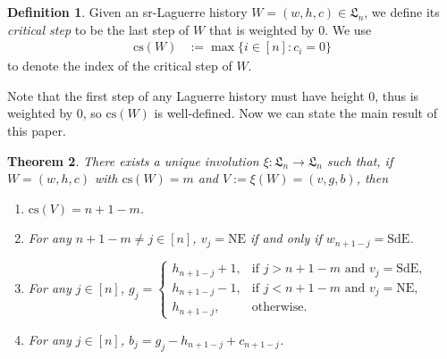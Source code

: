 \documentclass[12pt]{amsart}
\numberwithin{equation}{section}
\theoremstyle{plain}
\newtheorem{theorem}{Theorem}[section]
\theoremstyle{definition}
\newtheorem{Def}[theorem]{Definition}
\def\LH{\mathfrak{L}}
\def\NE{\mathrm{NE}}
\def\SdE{\mathrm{SdE}}
\def\cs{\mathrm{cs}}
\begin{document}
\begin{Def}
Given an sr-Laguerre history $W=(w,h,c)\in\LH_n$, we define its {\it critical step} to be the last step of $W$ that is weighted by $0$. We use
\begin{align}
\cs(W)& :=\max\{i\in[n] : c_i=0\}
\end{align}
to denote the index of the critical step of $W$.
\end{Def}

Note that the first step of any Laguerre history must have height $0$, thus is weighted by $0$, so $\cs(W)$ is well-defined. Now we can state the main result of this paper.

\begin{theorem}\label{thm:inv-xsi}
There exists a unique involution $\xi:\LH_n\rightarrow \LH_n$ such that, if $W=(w,h,c)$ with $\cs(W)=m$ and $V:=\xi(W)=(v,g,b)$, then
\begin{enumerate}
	\item $\cs(V)=n+1-m$.
	\item For any $n+1-m\neq j\in [n]$, $v_j=\NE$ if and only if $w_{n+1-j}=\SdE$.
	\item For any $j\in[n]$, $g_j=\begin{cases}
	h_{n+1-j}+1, & \text{if $j>n+1-m$ and $v_j=\SdE$,} \\
	h_{n+1-j}-1, & \text{if $j<n+1-m$ and $v_j=\NE$,} \\
	h_{n+1-j}, & \text{otherwise}.
	\end{cases}$
	\item For any $j\in[n]$, $b_j=g_j-h_{n+1-j}+c_{n+1-j}$.
\end{enumerate}
\end{theorem}
\end{document}
